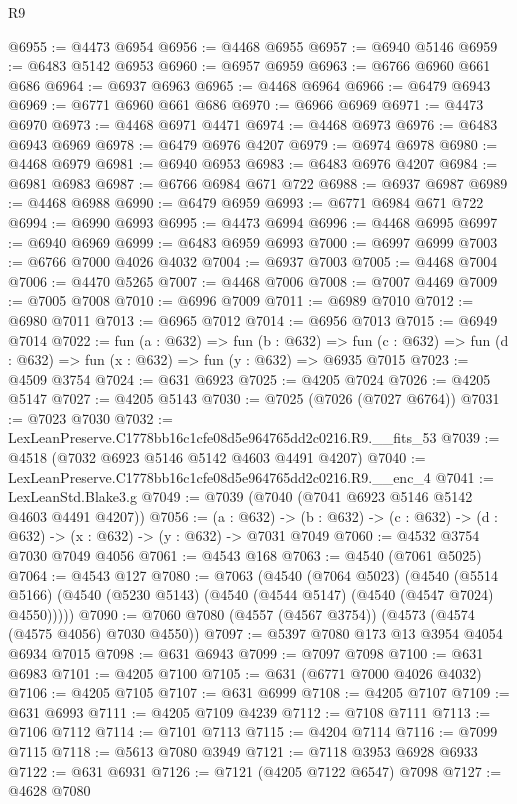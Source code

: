 \begin{lexlean}{R9}
\begin{coremodule}
@6955 := @4473 @6954
@6956 := @4468 @6955
@6957 := @6940 @5146
@6959 := @6483 @5142 @6953
@6960 := @6957 @6959
@6963 := @6766 @6960 @661 @686
@6964 := @6937 @6963
@6965 := @4468 @6964
@6966 := @6479 @6943
@6969 := @6771 @6960 @661 @686
@6970 := @6966 @6969
@6971 := @4473 @6970
@6973 := @4468 @6971 @4471
@6974 := @4468 @6973
@6976 := @6483 @6943 @6969
@6978 := @6479 @6976 @4207
@6979 := @6974 @6978
@6980 := @4468 @6979
@6981 := @6940 @6953
@6983 := @6483 @6976 @4207
@6984 := @6981 @6983
@6987 := @6766 @6984 @671 @722
@6988 := @6937 @6987
@6989 := @4468 @6988
@6990 := @6479 @6959
@6993 := @6771 @6984 @671 @722
@6994 := @6990 @6993
@6995 := @4473 @6994
@6996 := @4468 @6995
@6997 := @6940 @6969
@6999 := @6483 @6959 @6993
@7000 := @6997 @6999
@7003 := @6766 @7000 @4026 @4032
@7004 := @6937 @7003
@7005 := @4468 @7004
@7006 := @4470 @5265
@7007 := @4468 @7006
@7008 := @7007 @4469
@7009 := @7005 @7008
@7010 := @6996 @7009
@7011 := @6989 @7010
@7012 := @6980 @7011
@7013 := @6965 @7012
@7014 := @6956 @7013
@7015 := @6949 @7014
@7022 := fun (a : @632) =>
  fun (b : @632) =>
  fun (c : @632) => fun (d : @632) => fun (x : @632) => fun (y : @632) => @6935 @7015
@7023 := @4509 @3754
@7024 := @631 @6923
@7025 := @4205 @7024
@7026 := @4205 @5147
@7027 := @4205 @5143
@7030 := @7025 (@7026 (@7027 @6764))
@7031 := @7023 @7030
@7032 := LexLeanPreserve.C1778bb16c1cfe08d5e964765dd2c0216.R9.__fits_53
@7039 := @4518 (@7032 @6923 @5146 @5142 @4603 @4491 @4207)
@7040 := LexLeanPreserve.C1778bb16c1cfe08d5e964765dd2c0216.R9.__enc_4
@7041 := LexLeanStd.Blake3.g
@7049 := @7039 (@7040 (@7041 @6923 @5146 @5142 @4603 @4491 @4207))
@7056 := (a : @632) ->
  (b : @632) -> (c : @632) -> (d : @632) -> (x : @632) -> (y : @632) -> @7031 @7049
@7060 := @4532 @3754 @7030 @7049 @4056
@7061 := @4543 @168
@7063 := @4540 (@7061 @5025)
@7064 := @4543 @127
@7080 := @7063
    (@4540
      (@7064 @5023)
      (@4540 (@5514 @5166) (@4540 (@5230 @5143) (@4540 (@4544 @5147) (@4540 (@4547 @7024) @4550)))))
@7090 := @7060 @7080 (@4557 (@4567 @3754)) (@4573 (@4574 (@4575 @4056) @7030 @4550))
@7097 := @5397 @7080 @173 @13 @3954 @4054 @6934 @7015
@7098 := @631 @6943
@7099 := @7097 @7098
@7100 := @631 @6983
@7101 := @4205 @7100
@7105 := @631 (@6771 @7000 @4026 @4032)
@7106 := @4205 @7105
@7107 := @631 @6999
@7108 := @4205 @7107
@7109 := @631 @6993
@7111 := @4205 @7109 @4239
@7112 := @7108 @7111
@7113 := @7106 @7112
@7114 := @7101 @7113
@7115 := @4204 @7114
@7116 := @7099 @7115
@7118 := @5613 @7080 @3949
@7121 := @7118 @3953 @6928 @6933
@7122 := @631 @6931
@7126 := @7121 (@4205 @7122 @6547) @7098
@7127 := @4628 @7080

\end{coremodule}
\end{lexlean}
